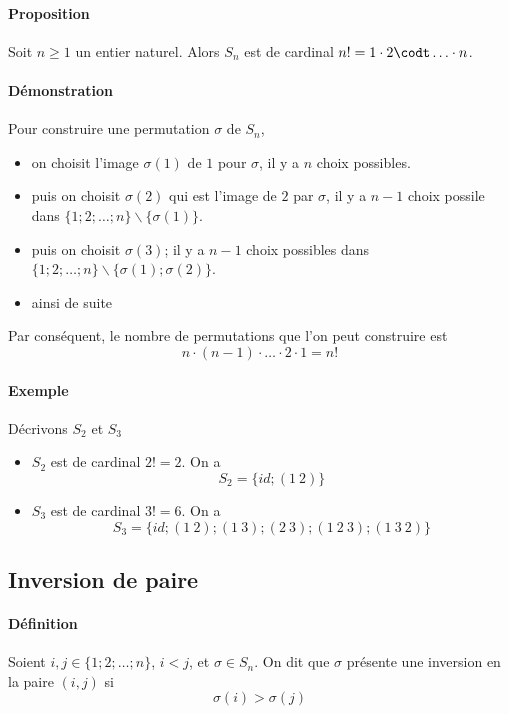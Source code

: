 \paragraph{Proposition} Soit $n \geq 1$ un entier naturel. Alors $S_n$ est de cardinal $n! = 1 \cdot 2 \codt \ldots \cdot n$.

\paragraph{Démonstration} Pour construire une permutation $\sigma$ de $S_n$,
\begin{itemize}
  \item on choisit l'image $\sigma(1)$ de $1$ pour $\sigma$, il y a $n$ choix possibles.
  \item puis on choisit $\sigma(2)$ qui est l'image de $2$ par $\sigma$, il y a $n-1$ choix possile dans $\{1; 2; \ldots; n\} \backslash \{\sigma(1)\}$.
  \item puis on choisit $\sigma(3)$; il y a $n-1$ choix possibles dans $\{1; 2; \ldots; n\} \backslash \{\sigma(1); \sigma(2)\}$.
  \item ainsi de suite
\end{itemize}
Par conséquent, le nombre de permutations que l'on peut construire est 
$$n \cdot (n-1) \cdot \ldots \cdot 2 \cdot 1 = n!$$

\paragraph{Exemple} Décrivons $S_2$ et $S_3$
\begin{itemize}
  \item $S_2$ est de cardinal $2! = 2$. On a 
    $$S_2 = \{id; (1 ~ 2)\}$$
  \item $S_3$ est de cardinal $3! = 6$. On a
    $$S_3 = \{id; (1 ~ 2); (1 ~ 3); (2 ~ 3); (1 ~ 2 ~ 3); (1 ~ 3 ~ 2)\}$$
\end{itemize}

%
\subsection{Inversion de paire}
%
\paragraph{Définition} Soient $i, j \in \{1; 2; \ldots; n\}$, $i < j$, et $\sigma \in S_n$. On dit que $\sigma$ présente une inversion en la paire $(i, j)$ si 
$$\sigma(i) > \sigma(j)$$

